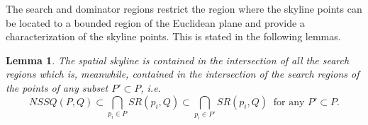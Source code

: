 \documentclass[11pt,onecolumn]{elsart3p}
\newtheorem{lemma}{Lemma}
\begin{document}

        The search and dominator regions restrict the region where the skyline points can be located to a bounded region of the Euclidean plane and provide a characterization of the skyline points. This is stated in the following lemmas.\\

        \begin{lemma}
            The spatial skyline is contained in the intersection of all the search regions which is, meanwhile, contained in the intersection of the search regions of the points of any subset $P'\subset P$, i.e.  %
             $$NSSQ(P,Q) \subset \bigcap_{p_i\in P} SR(p_i,Q) \subset \bigcap_{p_i \in P'} SR(p_i,Q)\ \text{ for any } P' \subset P.$$
            \label{lemma:SearchRegion}
        \end{lemma}
\end{document}
